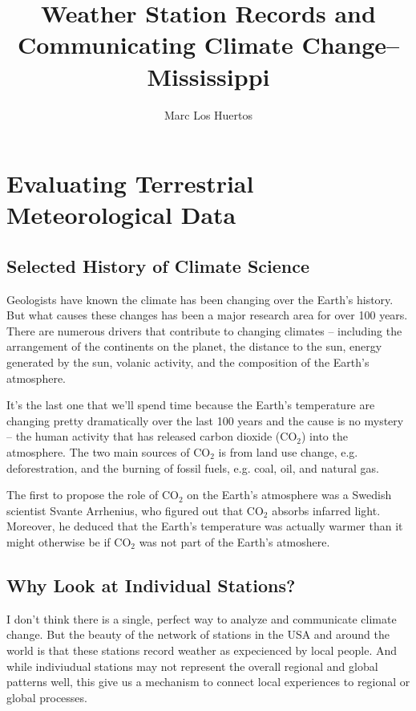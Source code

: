 \documentclass{article}
\title{Weather Station Records and Communicating Climate Change--Mississippi}
\author{Marc Los Huertos}
\begin{document}
\maketitle

\tableofcontents

\section{Evaluating Terrestrial Meteorological Data}

\subsection{Selected History of Climate Science}

Geologists have known the climate has been changing over the Earth's history. But what causes these changes has been a major research area for over 100 years. There are numerous drivers that contribute to changing climates -- including the arrangement of the continents on the planet, the distance to the sun, energy generated by the sun, volanic activity, and the composition of the Earth's atmosphere. 

It's the last one that we'll spend time because the Earth's temperature are changing pretty dramatically over the last 100 years and the cause is no mystery -- the human activity that has released carbon dioxide (CO$_2$) into the atmosphere. The two main sources of CO$_2$ is from land use change, e.g. deforestration, and the burning of fossil fuels, e.g. coal, oil, and natural gas. 

The first to propose the role of CO$_2$ on the Earth's atmosphere was a Swedish scientist Svante Arrhenius, who figured out that CO$_2$ absorbs infarred light. Moreover, he deduced that the Earth's temperature was actually warmer than it might otherwise be if CO$_2$ was not part of the Earth's atmoshere. 

\subsection{Why Look at Individual Stations?}

I don't think there is a single, perfect way to analyze and communicate climate change. But the beauty of the network of stations in the USA and around the world is that these stations record weather as expecienced by local people. And while indiviudual stations may not represent the overall regional and global patterns well, this give us a mechanism to connect local experiences to regional or global processes. 
\end{document}
